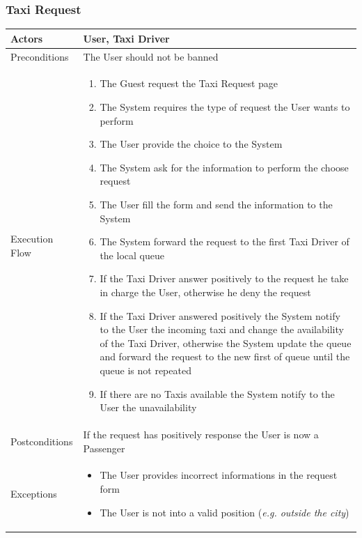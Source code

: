 \documentclass[english]{article}
\begin{document}
\subsubsection{Taxi Request}

\begin{tabular}{lp{8cm}}
\hline
Actors & User, Taxi Driver \\
\hline
Preconditions & The User should not be banned \\
\hline
Execution Flow &  
		\begin{enumerate}
			\item The Guest request the Taxi Request page
			\item The System requires the type of request the User wants to perform
			\item The User provide the choice to the System
			\item The System ask for the information to perform the choose request
			\item The User fill the form and send the information to the System
			\item The System forward the request to the first Taxi Driver of the local queue
			\item If the Taxi Driver answer positively to the request he take in charge the User, otherwise he deny the request
			\item If the Taxi Driver answered positively the System notify to the User the incoming taxi and change the availability of the Taxi Driver, otherwise the System update the queue and forward the request to the new first of queue until the queue is not repeated
			\item If there are no Taxis available the System notify to the User the unavailability
		\end{enumerate} 
	\\ 
\hline
Postconditions & If the request has positively response the User is now a Passenger \\
\hline
Exceptions & 
	\begin{itemize} 
		\item The User provides incorrect informations in the request form
		\item The User is not into a valid position (\emph{e.g. outside the city})
	\end{itemize}
\end{tabular}
\end{document}
